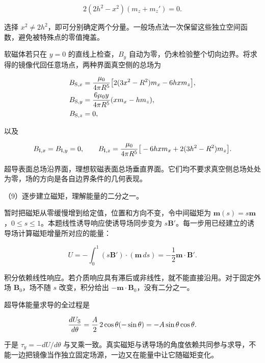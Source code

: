 \documentclass[12pt,a4paper,fontset=fandol]{ctexart}
\begin{document}
\[
2(2h^2-x^2)(m_z+m_z')=0.
\]

选择
\(x^2\ne2h^2\)，即可分别确定两个分量。一般场点法一次保留这些独立空间函数，避免被特殊点的零值掩盖。

软磁体若只在 \(y=0\) 的直线上检查，\(B_y\)
自动为零，仍未检验整个切向边界。将求得的镜像代回任意场点，两种界面真空侧的总场为

\[
\begin{aligned}
B_{{\rm S},x}
&=\frac{\mu_0}{4\pi R^5}
\big[2(3x^2-R^2)m_x-6hx m_z\big],\\
B_{{\rm S},y}
&=\frac{6\mu_0y}{4\pi R^5}(xm_x-hm_z),\\
B_{{\rm S},z}&=0,
\end{aligned}
\]

以及

\[
B_{{\rm I},x}=B_{{\rm I},y}=0,\qquad
B_{{\rm I},z}=\frac{\mu_0}{4\pi R^5}
\big[-6hx m_x+2(3h^2-R^2)m_z\big].
\]

超导表面总场沿界面，理想软磁表面总场垂直界面。它们均不要求真空侧总场处处为零，场的方向是各自边界条件的几何表现。

（9）逐步建立磁矩，理解能量的二分之一。

暂时把磁矩从零缓慢增到给定值，位置和方向不变，令中间磁矩为
\(\boldsymbol m(s)=s\boldsymbol m\)，\(0\le s\le1\)。本题线性诱导响应使诱导场同步变为
\(s\boldsymbol B'\)。每一步用已经建立的诱导场计算磁矩增量所对应的能量：

\[
U=-\int_0^1(s\boldsymbol B')\cdot(\boldsymbol m\,ds)
=-\frac12\boldsymbol m\cdot\boldsymbol B'.
\]

积分依赖线性响应。若介质响应具有滞后或非线性，就不能直接沿用。对于固定外场
\(\boldsymbol B_0\)，场不随 \(s\) 改变，积分给出
\(-\boldsymbol m\cdot\boldsymbol B_0\)，没有二分之一。

超导体能量求导的全过程是

\[
\frac{dU_{\rm S}}{d\theta}
=\frac A2\,2\cos\theta(-\sin\theta)
=-A\sin\theta\cos\theta.
\]

于是 \(\tau_y=-dU/d\theta\)
与叉乘一致。真实磁矩与诱导场的角度依赖共同参与求导，不能一边把镜像当作独立固定场源，一边又在能量中让它随磁矩变化。
\end{document}
